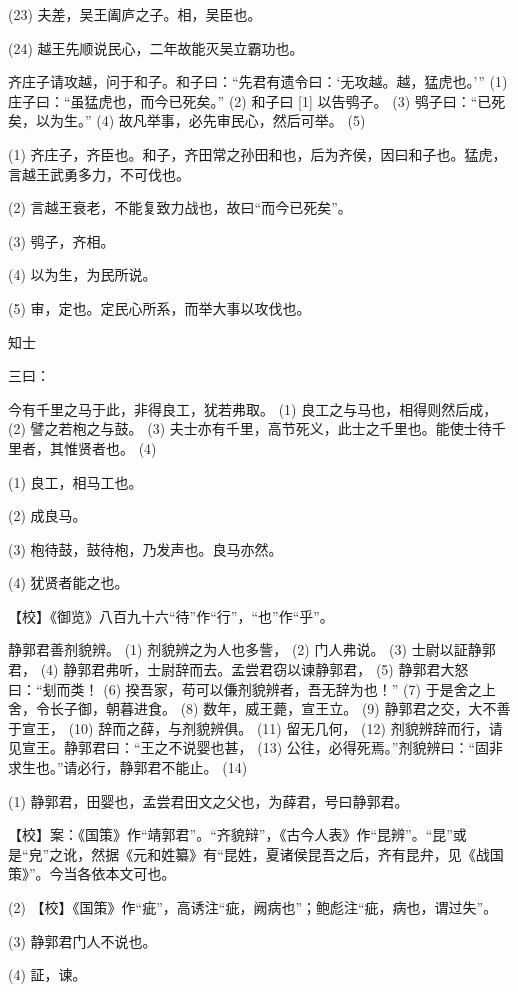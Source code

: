\documentclass[12pt,UTF8]{ctexbook}
\begin{document}
(23) 夫差，吴王阖庐之子。相，吴臣也。

(24) 越王先顺说民心，二年故能灭吴立霸功也。

齐庄子请攻越，问于和子。和子曰：“先君有遗令曰：‘无攻越。越，猛虎也。’” (1) 庄子曰：“虽猛虎也，而今已死矣。” (2) 和子曰 [1] 以告鸮子。 (3) 鸮子曰：“已死矣，以为生。” (4) 故凡举事，必先审民心，然后可举。 (5)

(1) 齐庄子，齐臣也。和子，齐田常之孙田和也，后为齐侯，因曰和子也。猛虎，言越王武勇多力，不可伐也。

(2) 言越王衰老，不能复致力战也，故曰“而今已死矣”。

(3) 鸮子，齐相。

(4) 以为生，为民所说。

(5) 审，定也。定民心所系，而举大事以攻伐也。





知士


三曰：

今有千里之马于此，非得良工，犹若弗取。 (1) 良工之与马也，相得则然后成， (2) 譬之若枹之与鼓。 (3) 夫士亦有千里，高节死义，此士之千里也。能使士待千里者，其惟贤者也。 (4)

(1) 良工，相马工也。

(2) 成良马。

(3) 枹待鼓，鼓待枹，乃发声也。良马亦然。

(4) 犹贤者能之也。

【校】《御览》八百九十六“待”作“行”，“也”作“乎”。

静郭君善剂貌辨。 (1) 剂貌辨之为人也多訾， (2) 门人弗说。 (3) 士尉以証静郭君， (4) 静郭君弗听，士尉辞而去。孟尝君窃以谏静郭君， (5) 静郭君大怒曰：“刬而类！ (6) 揆吾家，苟可以傔剂貌辨者，吾无辞为也！” (7) 于是舍之上舍，令长子御，朝暮进食。 (8) 数年，威王薨，宣王立。 (9) 静郭君之交，大不善于宣王， (10) 辞而之薛，与剂貌辨俱。 (11) 留无几何， (12) 剂貌辨辞而行，请见宣王。静郭君曰：“王之不说婴也甚， (13) 公往，必得死焉。”剂貌辨曰：“固非求生也。”请必行，静郭君不能止。 (14)

(1) 静郭君，田婴也，孟尝君田文之父也，为薛君，号曰静郭君。

【校】案：《国策》作“靖郭君”。“齐貌辩”，《古今人表》作“昆辨”。“昆”或是“皃”之讹，然据《元和姓纂》有“昆姓，夏诸侯昆吾之后，齐有昆弁，见《战国策》”。今当各依本文可也。

(2) 【校】《国策》作“疵”，高诱注“疵，阙病也”；鲍彪注“疵，病也，谓过失”。

(3) 静郭君门人不说也。

(4) 証，谏。
\end{document}
